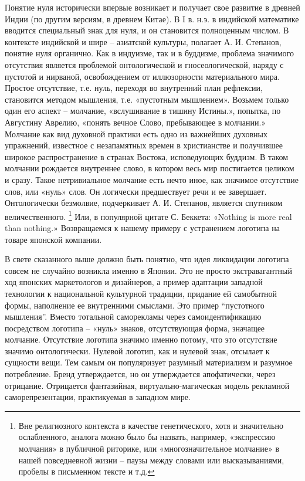 Понятие нуля исторически впервые возникает и получает свое развитие в древней Индии (по другим версиям, в древнем Китае). В I в. н.э. в индийской математике вводится специальный знак для нуля, и он становится полноценным числом.\autocite[][351]{stepanov2004}  В контексте индийской и шире -- азиатской культуры, полагает А. И. Степанов, понятие нуля органично. Как в индуизме, так и в буддизме, проблема значимого отсутствия является проблемой онтологической и гносеологической, наряду с пустотой и нирваной, освобождением от иллюзорности материального мира. Простое отсутствие, т.е. нуль, переходя во внутренний план рефлексии, становится методом мышления, т.е. «пустотным мышлением».\autocite[][352]{stepanov2004} Возьмем только один его аспект -- молчание, «вслушивание в тишину Истины.», попытка, по Августину Аврелию, «понять вечное Слово, пребывающее в молчании.» \autocite[][ХI, 6, 8]{avgustin1992} Молчание как вид духовной практики есть одно из важнейших духовных упражнений, известное с незапамятных времен в христианстве и получившее широкое распространение в странах Востока, исповедующих буддизм. В таком молчании рождается внутреннее слово, в котором весь мир постигается  целиком и сразу.\autocite[][112-125.]{nestik1998} Такое нетривиальное молчание есть нечто иное, как значимое отсутствие слов, или «нуль» слов. Он логически предшествует речи и ее завершает. Онтологически безмолвие, подчеркивает А. И. Степанов, является спутником величественного. \autocite[][358]{stepanov2004} \footnote{Вне религиозного контекста  в качестве генетического, хотя и значительно ослабленного,  аналога можно было бы назвать, например,  «экспрессию молчания» в публичной риторике,  или «многозначительное молчание» в нашей повседневной жизни – паузы между словами или высказываниями, пробелы в письменном тексте и т.д.} Или, в популярной цитате С. Беккета: «Nothing is more real than nothing.» \autocite[][63]{esslin2004} Возвращаемся к нашему примеру с устранением логотипа на товаре японской компании.

В свете сказанного выше должно быть понятно, что идея ликвидации логотипа совсем не случайно возникла именно в Японии. Это не просто экстравагантный ход японских маркетологов и дизайнеров, а пример адаптации западной технологии к национальной культурной традиции, придание ей самобытной формы, наполнение ее внутренними смыслами. Это пример “пустотного мышления”. Вместо тотальной саморекламы через самоидентификацию посредством логотипа -- «нуль» знаков, отсутствующая форма, значащее молчание.  Отсутствие логотипа значимо именно потому, что это отсутствие значимо онтологически. Нулевой логотип, как и нулевой знак, отсылает к сущности вещи. Тем самым он  популяризует  разумный материализм и разумное потребление.  Бренд утверждается, но он утверждается апофатически, через отрицание. Отрицается фантазийная, виртуально-магическая модель рекламной саморепрезентации, практикуемая в западном мире. \autocite[][410-423]{williams1999} 

